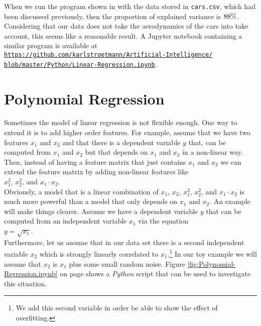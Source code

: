 When we run the program shown in  with the data stored in \texttt{cars.csv},
which had been discussed previously, then the proportion of explained variance is $88 \mathtt{\symbol{37}}$.  Considering that our data does
not take the aerodynamics of the cars into take account, this seems like a reasonable result.  A Jupyter notebook
containing a similar program is available at
\\[0.2cm]
\hspace*{1.3cm}
\href{https://github.com/karlstroetmann/Artificial-Intelligence/blob/master/Python/Linear-Regression.ipynb}{\texttt{https://github.com/karlstroetmann/Artificial-Intelligence/\\
\hspace*{2.2cm}
 blob/master/Python/Linear-Regression.ipynb}}.

\section{Polynomial Regression}
Sometimes the model of linear regression is not flexible enough.  One way to extend it is to add higher order
features.  For example, assume that we have two features $x_1$ and $x_2$ and that there is a dependent variable
$y$ that,  can be computed from $x_1$ and $x_2$ but that depends on $x_1$ and $x_2$ in a non-linear way.
Then, instead of having a feature matrix that just contains $x_1$ and $x_2$ we can extend the feature matrix by
adding non-linear features like
\\[0.2cm]
\hspace*{1.3cm}
$x_1^2$, $x_2^2$, and $x_1 \cdot x_2$.
\\[0.2cm]
Obviously, a model that is a linear combination of $x_1$, $x_2$, $x_1^2$, $x_2^2$, and $x_1 \cdot x_2$ is much
more powerful than a model that only depends on $x_1$ and $x_2$.  An example will make things clearer.
Assume we have a dependent variable $y$ that can be computed from an independent variable $x_1$ via the
equation
\\[0.2cm]
\hspace*{1.3cm}
$y = \sqrt{x_1}$.
\\[0.2cm]
Furthermore, let us assume that in our data set there is a second independent variable $x_2$ which is strongly
linearly correlated to $x_1$.\footnote{
  We add this second variable in order be able to show the effect of overfitting.
}
In our toy example we will assume that $x_2$ is $x_1$ plus some small random noise.
Figure \ref{fig:Polynomial-Regression.ipynb} on page \pageref{fig:Polynomial-Regression.ipynb} shows a
\textsl{Python} script that can be used to investigate this situation.



